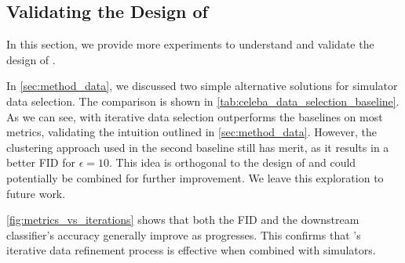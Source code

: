 


\subsection{Validating the Design of \simpe{}}
In this section, we provide more experiments to understand and validate the design of \simpe{}.



In \cref{sec:method_data}, we discussed two simple alternative solutions for simulator data selection. The comparison is shown in \cref{tab:celeba_data_selection_baseline}. As we can see, \simpe{} with iterative data selection outperforms the baselines on most metrics, validating the intuition outlined in \cref{sec:method_data}. However, the clustering approach used in the second baseline still has merit, as it results in a better FID for $\epsilon=10$. This idea is orthogonal to the design of \simpe{} and could potentially be combined for further improvement. We leave this exploration to future work.

 \cref{fig:metrics_vs_iterations} shows that both the FID and the downstream classifier's accuracy generally improve as \pe{} progresses. This confirms that \pe{}'s iterative data refinement process is effective when combined with simulators.




